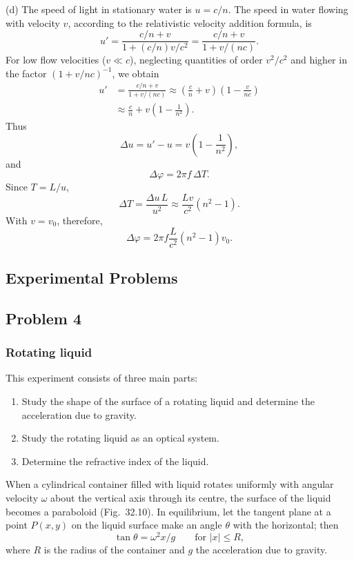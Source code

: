 (d) The speed of light in stationary water is $u=c/n$. The speed in water flowing with velocity $v$, according to the relativistic velocity addition formula, is
\[
u'=\frac{c/n+v}{1+(c/n)v/c^2}=\frac{c/n+v}{1+v/(nc)}.
\]
For low flow velocities ($v\ll c$), neglecting quantities of order $v^2/c^2$ and higher in the factor $(1+v/nc)^{-1}$, we obtain
\begin{align*}
u'&=\frac{c/n+v}{1+v/(nc)}\approx\left(\frac{c}{n}+v\right)\left(1-\frac{v}{nc}\right)\\
&\approx\frac{c}{n}+v\left(1-\frac{1}{n^2}\right).
\end{align*}
Thus
\[
\Delta u=u'-u=v\left(1-\frac{1}{n^2}\right),
\]
and
\[
\Delta\varphi=2\pi f\,\Delta T.
\]
Since $T=L/u$,
\[
\Delta T=\frac{\Delta u\,L}{u^2}\approx\frac{Lv}{c^2}(n^2-1).
\]
With $v=v_0$, therefore,
\[
\Delta\varphi=2\pi f\frac{L}{c^2}(n^2-1)v_0.
\]

\subsection*{Experimental Problems}

\subsection*{Problem 4}

\subsubsection*{Rotating liquid}

This experiment consists of three main parts:

\begin{enumerate}
\item[(1)] Study the shape of the surface of a rotating liquid and determine the acceleration due to gravity.
\item[(2)] Study the rotating liquid as an optical system.
\item[(3)] Determine the refractive index of the liquid.
\end{enumerate}

When a cylindrical container filled with liquid rotates uniformly with angular velocity $\omega$ about the vertical axis through its centre, the surface of the liquid becomes a paraboloid (Fig.~32.10). In equilibrium, let the tangent plane at a point $P(x,y)$ on the liquid surface make an angle $\theta$ with the horizontal; then
\begin{equation}
\tan\theta=\omega^2x/g\qquad\text{for }|x|\le R, \tag{1}
\end{equation}
where $R$ is the radius of the container and $g$ the acceleration due to gravity.

